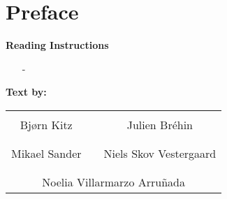 \chapter*{Preface}
\vspace{-12 pt}
\lipsum[3]

\textbf{Reading Instructions}
\vspace{-10 pt}
\begin{itemize}
\item[-] \lipsum[6]
\end{itemize}

%
\textbf{Text by:}\\
\vspace{-12 pt}
\begin{table}[H]
	\centering
		\begin{tabular}{c c c}
			\underline{\phantom{JAERJAERJAERJAERGO}} & \phantom{cookies} & \underline{\phantom{JAERJAERJAERJAERGO}} \\
			Bjørn Kitz			& \phantom{cookies} & Julien Br\'ehin		\\
			&&\\
			\underline{\phantom{JAERJAERJAERJAERGO}} & \phantom{cookies} & \underline{\phantom{JAERJAERJAERJAERGO}} \\
			Mikael Sander			& \phantom{cookies} & Niels Skov Vestergaard		\\
			&&\\
	    \multicolumn{3}{c}{\underline{\phantom{JAERJAERJAERJAERGO}}}\\
	    \multicolumn{3}{c}{Noelia Villarmarzo Arruñada}\\				
		\end{tabular}
\end{table}
\pagebreak
